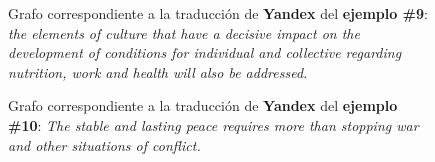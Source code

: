\documentclass[a4paper,12pt,spanish]{book}
\begin{document}
\begin{figure}[htbp]
\centering
\capstart

\caption[Grafo correspondiente a la traducción de Yandex del ejemplo \#9.]{Grafo correspondiente a la traducción de \textbf{Yandex} del \textbf{ejemplo \#9}:
\emph{the elements of culture that have a decisive impact on the development
of conditions for individual and collective regarding nutrition, work
and health will also be addressed.}}\label{appendix-data:sample09-yandex}\end{figure}
\begin{figure}[htbp]
\centering
\capstart

\caption[Grafo correspondiente a la traducción de Yandex del ejemplo \#10.]{Grafo correspondiente a la traducción de \textbf{Yandex} del \textbf{ejemplo \#10}:
\emph{The stable and lasting peace requires more than stopping war and other
situations of conflict.}}\label{appendix-data:sample10-yandex}\end{figure}
\end{document}
